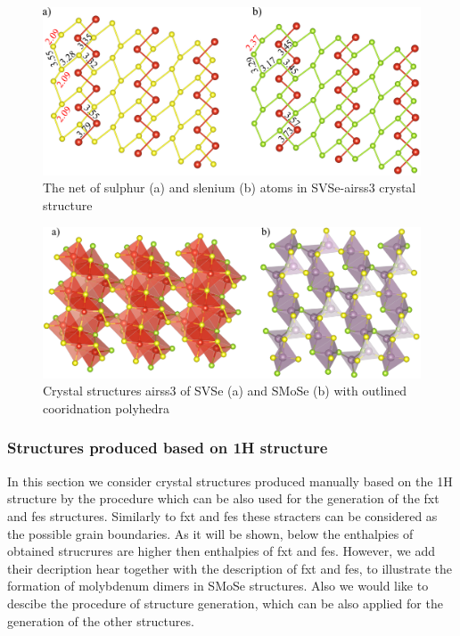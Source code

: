 \documentclass[a4paperm]{article}
\begin{document}
\begin{figure}[H]
	\includegraphics[width=\textwidth]{airss3_S_Se.png}
	\caption{The net of sulphur (a) and slenium (b) atoms in SVSe-airss3 crystal structure}
	\label{airss3_S_Se}
\end{figure}

\begin{figure}[H]
	\includegraphics[width=\textwidth]{airss3_poly.png}
	\caption{Crystal structures airss3 of SVSe (a) and SMoSe (b) with outlined cooridnation polyhedra}
	\label{airss3_poly}
\end{figure}




\subsubsection{Structures produced based on 1H structure}

In this section we consider crystal structures produced manually based on the 1H structure by the procedure which can be also used for the generation of the fxt and fes structures.
Similarly to fxt and fes these stracters can be considered as the possible grain boundaries.
As it will be shown, below the enthalpies of obtained strucrures are higher then enthalpies of fxt and fes.
However, we add their decription hear together with the description of fxt and fes, to illustrate the formation of molybdenum dimers in SMoSe structures.
Also we would like to descibe the procedure of structure generation, which can be also applied for the generation of the other structures.
\end{document}
